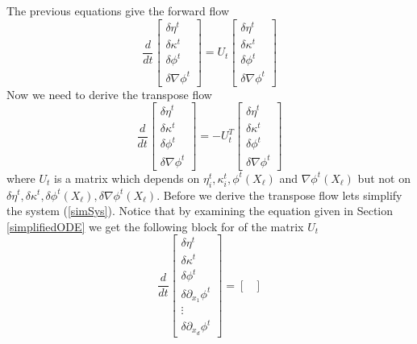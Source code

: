 \documentclass[noinfoline]{imsart}
\begin{document}
{The previous equations give the forward flow
\begin{equation}
\frac{d}{dt} \left[\begin{array}{c} \delta\eta^t\\ \delta \kappa^t \\ \delta\phi^t \\ \delta \nabla\phi^t   \end{array}\right]
= U_t  \left[\begin{array}{c} \delta\eta^t\\ \delta \kappa^t \\ \delta\phi^t \\ \delta\nabla\phi^t   \end{array}\right]
\end{equation}
Now we need to derive the transpose flow
\begin{equation}
\label{simSys}
\frac{d}{dt} \left[\begin{array}{c} \delta\eta^t\\ \delta \kappa^t \\ \delta\phi^t \\ \delta \nabla\phi^t   \end{array}\right]
= -U_t^T  \left[\begin{array}{c} \delta\eta^t\\ \delta \kappa^t \\ \delta\phi^t \\ \delta\nabla\phi^t   \end{array}\right]
\end{equation}
where $U_t$ is a matrix which depends on $\eta^t_i, \kappa^t_i, \phi^t(X_\ell) $ and $\nabla\phi^t(X_\ell)$ but not on  $\delta\eta^t, \delta\kappa^t, \delta\phi^t(X_\ell), \delta \nabla\phi^t(X_\ell)$. 
Before we derive the transpose flow lets simplify the system (\ref{simSys}). Notice that by examining the equation given in Section \ref{simplifiedODE} we get the following block for of the matrix $U_{t}$
\begin{equation}
\frac{d}{dt} \left[\begin{array}{c} \delta\eta^t\\ \delta \kappa^t \\ \delta\phi^t \\ \delta\partial_{x_1} \phi^t  \\ \vdots \\ \delta\partial_{x_d} \phi^t   \end{array}\right]
= 
\begin{bmatrix}

\end{bmatrix}
\end{equation}}
\end{document}
